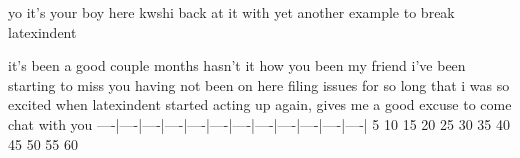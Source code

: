 \begin{myfriendhowareyou}
    yo it's your boy here kwshi back at it with yet another
    example to break latexindent
\end{myfriendhowareyou}
it's been a good couple months hasn't it how you been my
friend i've been starting to miss you having not been on
here filing issues for so long that i was so excited when
latexindent started acting up again, gives me a good excuse
to come chat with you
----|----|----|----|----|----|----|----|----|----|----|----|
   5   10   15   20   25   30   35   40   45   50   55   60